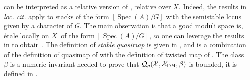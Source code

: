 \documentclass{amsart}
\newcommand{\cQ}{\mathcal{Q}}
\newcommand{\cX}{\mathcal{X}}
\newcommand{\spec}{\operatorname{Spec}}
\newcommand{\dm}{{\rm DM}}
\theoremstyle{definition}
\theoremstyle{definition}
\begin{document}
{ can be interpreted as a relative version of \cites{ciocan2010moduli,orbifold_qmap_theory}, relative over $X$. Indeed, the results in \textit{loc. cit.} apply to stacks of the form $[\spec(A)/G]$ with the semistable locus given by a character of $G$. The main observation is that a good moduli space is, \'etale locally on $X$, of the form $[\spec(A)/G]$, so one can leverage the results in \cites{ciocan2010moduli,orbifold_qmap_theory} to obtain . The definition of \textit{stable quasimap} is given in , and is a combination of the definition of quasimap of \cite{orbifold_qmap_theory} with the definition of twisted map of \cite{dli1}. The class $\beta$ is a numeric invariant needed to prove that $\cQ_g(\cX,\cX_\dm,\beta)$ is bounded, it is defined in .

}
\end{document}
